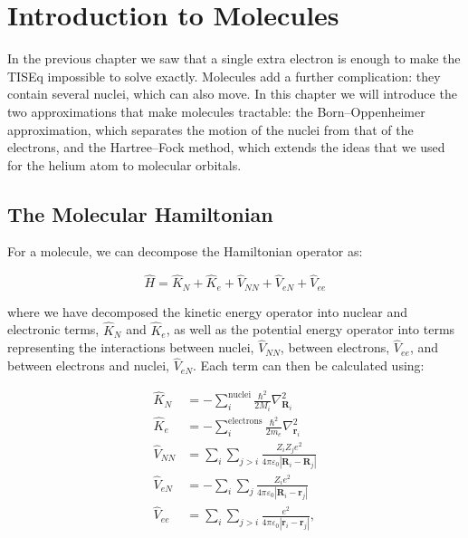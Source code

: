 \documentclass[
  english,
  9pt,
]{extbook}
\theoremstyle{definition}
\theoremstyle{definition}
\theoremstyle{definition}
\theoremstyle{definition}
\theoremstyle{remark}
\begin{document}
\chapter{Introduction to Molecules}\label{Molecules}

In the previous chapter we saw that a single extra electron is enough to make the TISEq impossible to solve exactly. Molecules add a further complication: they contain several nuclei, which can also move. In this chapter we will introduce the two approximations that make molecules tractable: the Born--Oppenheimer approximation, which separates the motion of the nuclei from that of the electrons, and the Hartree--Fock method, which extends the ideas that we used for the helium atom to molecular orbitals.

\section{The Molecular Hamiltonian}\label{the-molecular-hamiltonian}

For a molecule, we can decompose the Hamiltonian operator as:

\begin{equation}
\hat{H} = \hat{K}_N +\hat{K}_{e} + \hat{V}_{NN} + \hat{V}_{eN} + \hat{V}_{ee}
\label{eq:molham1}
\end{equation}

where we have decomposed the kinetic energy operator into nuclear and electronic terms, \(\hat{K}_N\) and \(\hat{K}_e\), as well as the potential energy operator into terms representing the interactions between nuclei, \(\hat{V}_{NN}\), between electrons, \(\hat{V}_{ee}\), and between electrons and nuclei, \(\hat{V}_{eN}\). Each term can then be calculated using:

\begin{equation}
\begin{aligned}
\hat{K}_{N} &=-\sum_{i}^{\text{nuclei}}{\frac  {\hbar ^{2}}{2M_{i}}}\nabla_{{{\mathbf  {R}}_{i}}}^{2} \\
\hat  {K}_{e} &=-\sum_{i}^{\text{electrons}}{\frac  {\hbar ^{2}}{2m_{e}}}\nabla _{{{\mathbf{r}}_{i}}}^{2} \\
\hat{V}_{{NN}} &= \sum _{i}\sum _{{j>i}}{\frac  {Z_{i}Z_{j}e^{2}}{4\pi \varepsilon _{0}\left|{\mathbf  {R}}_{i}-{\mathbf  {R}}_{j}\right|}} \\
\hat  {V}_{{eN}} &=-\sum _{i}\sum _{j}{\frac  {Z_{i}e^{2}}{4\pi \varepsilon_{0}\left|{\mathbf  {R}}_{i}-{\mathbf  {r}}_{j}\right|}} \\
\hat{V}_{{ee}} &= \sum _{i}\sum _{{j>i}}{\frac  {e^{2}}{4\pi \varepsilon _{0}\left|{\mathbf  {r}}_{i}-{\mathbf  {r}}_{j}\right|}},
\end{aligned}
\label{eq:molham2}
\end{equation}
\end{document}

